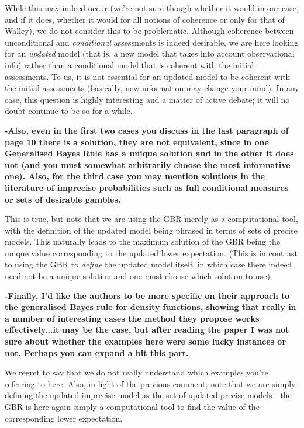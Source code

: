 \documentclass[twoside,11pt]{letter}
\begin{document}
While this may indeed occur (we're not sure though whether it would in our case, and if it does, whether it would for all notions of coherence or only for that of Walley), we do not consider this to be problematic. Although coherence between unconditional and \emph{conditional} assessments is indeed desirable, we are here looking for an \emph{updated} model (that is, a new model that takes into account observational info) rather than a conditional model that is coherent with the initial assessments. To us, it is not essential for an updated model to be coherent with the initial assessments (basically, new information may change your mind). In any case, this question is highly interesting and a matter of active debate; it will no doubt continue to be so for a while.

{\bf
-Also, even in the first two cases you discuss in the last paragraph of page 10 there is a solution, they are not equivalent, since in one Generalised Bayes Rule has a unique solution and in the other it does not (and you must somewhat arbitrarily choose the most informative one). Also, for the third case you may mention solutions in the literature of imprecise probabilities such as full conditional measures or sets of desirable gambles. }

This is true, but note that we are using the GBR merely as a computational tool, with the definition of the updated model being phrased in terms of sets of precise models. This naturally leads to the maximum solution of the GBR being the unique value corresponding to the updated lower expectation. (This is in contrast to using the GBR to \emph{define} the updated model itself, in which case there indeed need not be a unique solution and one must choose which solution to use).

{\bf
-Finally, I'd like the authors to be more specific on their approach to the generalised Bayes rule for density functions, showing that really in a number of interesting cases the method they propose works effectively...it may be the case, but after reading the paper I was not sure about whether the examples here were some lucky instances or not. Perhaps you can expand a bit this part. }

We regret to say that we do not really understand which examples you're referring to here. Also, in light of the previous comment, note that we are simply defining the updated imprecise model as the set of updated precise models---the GBR is here again simply a computational tool to find the value of the corresponding lower expectation.
\end{document}
